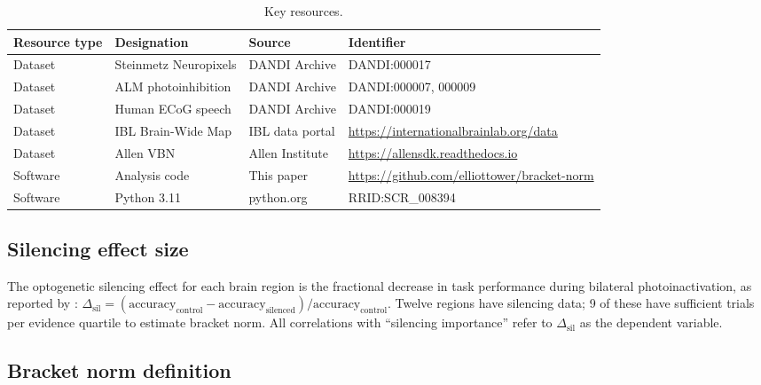 \documentclass[9pt,lineno]{elife}
\begin{document}
\begin{table}[t]
\centering
\caption{Key resources.}
\label{tab:key_resources}
\small
\begin{tabular}{p{2.8cm}p{3.2cm}p{2.5cm}p{3.5cm}}
\toprule
\textbf{Resource type} & \textbf{Designation} & \textbf{Source} & \textbf{Identifier} \\
\midrule
Dataset & Steinmetz Neuropixels & DANDI Archive & DANDI:000017 \\
Dataset & ALM photoinhibition & DANDI Archive & DANDI:000007, 000009 \\
Dataset & Human ECoG speech & DANDI Archive & DANDI:000019 \\
Dataset & IBL Brain-Wide Map & IBL data portal & \url{https://internationalbrainlab.org/data} \\
Dataset & Allen VBN & Allen Institute & \url{https://allensdk.readthedocs.io} \\
Software & Analysis code & This paper & \url{https://github.com/elliottower/bracket-norm} \\
Software & Python 3.11 & python.org & RRID:SCR\_008394 \\
\bottomrule
\end{tabular}
\end{table}

\subsection{Silencing effect size}
\label{sec:silencing_def}

The optogenetic silencing effect for each brain region is the fractional decrease in task performance during bilateral photoinactivation, as reported by \citet{zatkahaas2021}: $\Delta_{\text{sil}} = (\text{accuracy}_{\text{control}} - \text{accuracy}_{\text{silenced}}) / \text{accuracy}_{\text{control}}$. Twelve regions have silencing data; 9 of these have sufficient trials per evidence quartile to estimate bracket norm. All correlations with ``silencing importance'' refer to $\Delta_{\text{sil}}$ as the dependent variable.

\subsection{Bracket norm definition}
\label{sec:bn_def}
\end{document}
